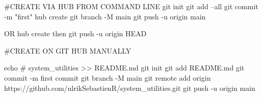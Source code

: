 #CREATE VIA HUB FROM COMMAND LINE
git init
git add --all
git commit -m "first"
hub create
git branch -M main
git push -u origin main
 
OR hub create then git push -u origin HEAD



#CREATE ON GIT HUB MANUALLY

echo # system_utilities >> README.md
git init
git add README.md
git commit -m first commit
git branch -M main
git remote add origin https://github.com/ulrikSebastienR/system_utilities.git
git push -u origin main
